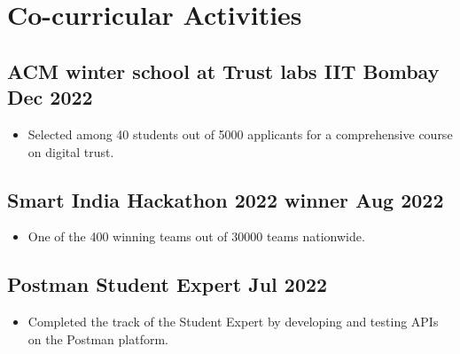 \documentclass[a4,10pt]{article}
\newenvironment{zitemize}{
\begin{itemize}\itemsep0pt \parskip0pt \parsep1pt}
{\end{itemize}\vspace{-0.5cm}}
\begin{document}



\section{Co-curricular Activities}
\vspace{-0.1cm}
\subsection*{ACM winter school at Trust labs IIT Bombay \hfill Dec 2022}
\vspace{-0.05cm}
\begin{zitemize}
    \item Selected among 40 students out of 5000 applicants for a comprehensive course on digital trust.
    \vspace{-0.1cm}
\end{zitemize} 
\subsection*{Smart India Hackathon 2022 winner \hfill Aug 2022}
\vspace{-0.05cm}
\begin{zitemize}
    \item One of the 400 winning teams out of 30000 teams nationwide.
\end{zitemize} 
\vspace{-0.1cm}
\subsection*{Postman Student Expert \hfill Jul 2022}
\vspace{-0.05cm}
\begin{zitemize}
    \item Completed the track of the Student Expert by developing and testing APIs on the Postman platform.
    \end{zitemize}
\vspace{-0.1cm}
\end{document}
